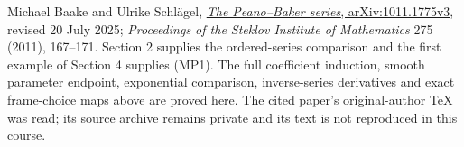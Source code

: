\documentclass[
  11pt,
]{article}
\begin{document}
Michael Baake and Ulrike Schlägel,
\href{https://arxiv.org/abs/1011.1775v3}{\emph{The Peano--Baker series},
arXiv:1011.1775v3}, revised 20 July 2025; \emph{Proceedings of the
Steklov Institute of Mathematics} 275 (2011), 167--171. Section 2
supplies the ordered-series comparison and the first example of Section
4 supplies (MP1). The full coefficient induction, smooth parameter
endpoint, exponential comparison, inverse-series derivatives and exact
frame-choice maps above are proved here. The cited paper's
original-author TeX was read; its source archive remains private and its
text is not reproduced in this course.
\end{document}
